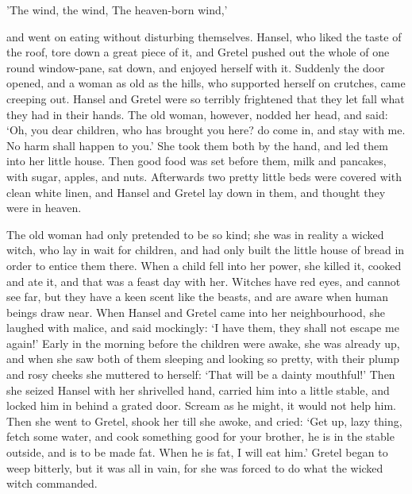 'The wind, the wind,
The heaven-born wind,'

and went on eating without disturbing themselves. Hansel, who liked the taste of the roof, tore down a great piece of it, and Gretel pushed out the whole of one round window-pane, sat down, and enjoyed herself with it. Suddenly the door opened, and a woman as old as the hills, who supported herself on crutches, came creeping out. Hansel and Gretel were so terribly frightened that they let fall what they had in their hands. The old woman, however, nodded her head, and said: `Oh, you dear children, who has brought you here? do come in, and stay with me. No harm shall happen to you.' She took them both by the hand, and led them into her little house. Then good food was set before them, milk and pancakes, with sugar, apples, and nuts. Afterwards two pretty little beds were covered with clean white linen, and Hansel and Gretel lay down in them, and thought they were in heaven.

The old woman had only pretended to be so kind; she was in reality a wicked witch, who lay in wait for children, and had only built the little house of bread in order to entice them there. When a child fell into her power, she killed it, cooked and ate it, and that was a feast day with her. Witches have red eyes, and cannot see far, but they have a keen scent like the beasts, and are aware when human beings draw near. When Hansel and Gretel came into her neighbourhood, she laughed with
malice, and said mockingly: `I have them, they shall not escape me again!' Early in the morning before the children were awake, she was already up, and when she saw both of them sleeping and looking so pretty, with their plump and rosy cheeks she muttered to herself: `That will be a dainty mouthful!' Then she seized Hansel with her shrivelled hand, carried him into a little stable, and locked him in behind a grated door. Scream as he might, it would not help him. Then she went to
Gretel, shook her till she awoke, and cried: `Get up, lazy thing, fetch some water, and cook something good for your brother, he is in the stable outside, and is to be made fat. When he is fat, I will eat him.' Gretel began to weep bitterly, but it was all in vain, for she was forced to do what the wicked witch commanded.

